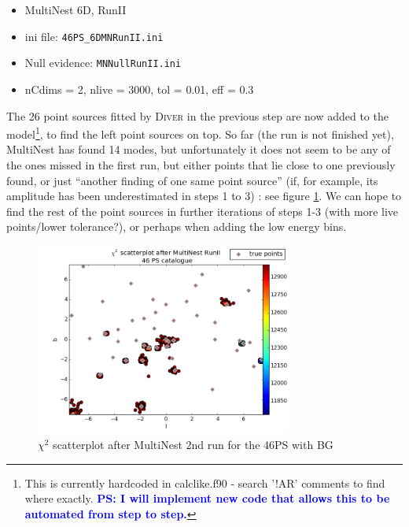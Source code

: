 \documentclass{article}
\newcommand{\ps}[1]{\textcolor{blue}{{\bf PS: #1}}}
\begin{document}
\begin{itemize}
\item MultiNest 6D, RunII
\item ini file: \verb=46PS_6DMNRunII.ini=
\item Null evidence: \verb=MNNullRunII.ini=
\item nCdims = 2, nlive = 3000, tol = 0.01, eff = 0.3
\end{itemize}
The 26 point sources fitted by \textsc{Diver} in the previous step are now added to the model\footnote{This is currently
hardcoded in calclike.f90 - search '!AR' comments to find where exactly. \ps{I will implement new code that allows this
to be automated from step to step.}}, to find the left point sources on top. So far (the run is not finished yet), MultiNest
has found 14 modes, but unfortunately it does not seem to be any of the ones missed in the first run, but either points
that lie close to one previously found, or just ``another finding of one same point source'' (if, for example, its amplitude
has been underestimated in steps 1 to 3) : see figure \ref{fig:scatterplot46PSMNII}. We can hope to find the rest of the
point sources in further iterations of steps 1-3 (with more live points/lower tolerance?), or perhaps when adding the low
energy bins.
\begin{figure}[h]
\centering
\includegraphics[clip = true,width=0.75\textwidth]{figs/scatplt46PSafterMNRunII.png}
\caption{$\chi^{2}$ scatterplot after MultiNest 2nd run for the 46PS with BG\label{fig:scatterplot46PSMNII}}
\end{figure}
\FloatBarrier
\end{document}
